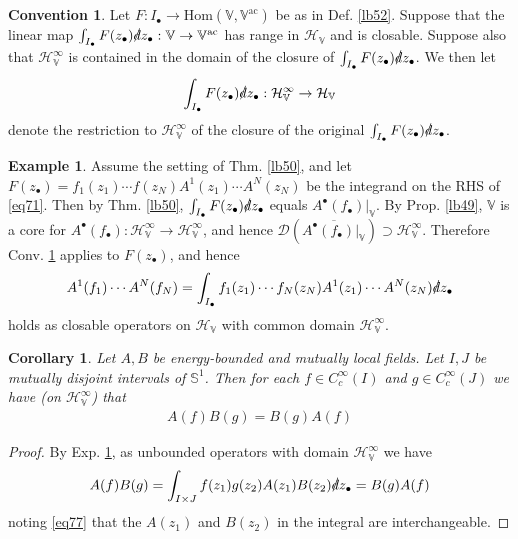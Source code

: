 \documentclass[12pt,b5paper,notitlepage]{article}
\theoremstyle{definition}
\newtheorem{eg}[df]{Example}
\newtheorem{cv}[df]{Convention}
\theoremstyle{plain}
\newtheorem{co}[df]{Corollary}
\newcommand{\ovl}{\overline}
\newcommand{\Hom}{\mathrm{Hom}}
\newcommand{\Dom}{\scr{D}}
\newcommand{\scr}{\mathscr}
\newcommand{\blt}{\bullet}
\newcommand{\Vbb}{\mathbb V}
\newcommand{\Sbb}{{\mathbb S}}
\newcommand{\HV}{\mathcal H_{\mathbb V}}
\newcommand{\sd}{\slashed{d}}
\newcommand{\ac}{\mathrm{ac}}
\numberwithin{equation}{section}
\begin{document}
\subsection{}


\begin{cv}\label{lb53}
Let $F:I_\blt\rightarrow\Hom(\Vbb,\Vbb^\ac)$ be as in Def. \ref{lb52}. Suppose that the linear map $\int_{I_\blt}F(z_\blt)\sd z_\blt:\Vbb\rightarrow\Vbb^\ac$ has range in $\HV$ and is closable. Suppose also that $\HV^\infty$ is contained in the domain of the closure of $\int_{I_\blt}F(z_\blt)\sd z_\blt$. We then let \index{zz@$\int_{I_\blt}F(z_\blt)\sd z_\blt$} 
\begin{align*}
\int_{I_\blt}F(z_\blt)\sd z_\blt:\HV^\infty\rightarrow\HV
\end{align*}
denote the restriction to $\HV^\infty$ of the closure of the original $\int_{I_\blt}F(z_\blt)\sd z_\blt$. 
\end{cv}


\begin{eg}\label{lb54}
Assume the setting of Thm. \ref{lb50}, and let $F(z_\blt)=f_1(z_1)\cdots f(z_N)A^1(z_1)\cdots A^N(z_N)$ be the integrand on the RHS of \eqref{eq71}. Then by Thm. \ref{lb50}, $\int_{I_\blt}F(z_\blt)\sd z_\blt$ equals $A^\blt(f_\blt)|_\Vbb$. By Prop. \ref{lb49}, $\Vbb$ is a core for $A^\blt(f_\blt):\HV^\infty\rightarrow\HV^\infty$, and hence $\Dom(\ovl{A^\blt(f_\blt)|_\Vbb})\supset\HV^\infty$. Therefore Conv. \ref{lb53} applies to $F(z_\blt)$, and hence
\begin{align}
A^1(f_1)\cdots A^N(f_N)=\int_{I_\blt} f_1(z_1)\cdots f_N(z_N)A^1(z_1)\cdots A^N(z_N)\sd z_\blt
\end{align}
holds as closable operators on $\HV$ with common domain $\HV^\infty$.
\end{eg}


\begin{co}\label{lb66}
Let $A,B$ be energy-bounded and mutually local fields. Let $I,J$ be mutually disjoint intervals of $\Sbb^1$. Then for each $f\in C_c^\infty(I)$ and $g\in C_c^\infty(J)$ we have (on $\HV^\infty$) that
\begin{align*}
A(f)B(g)=B(g)A(f)
\end{align*}
\end{co}


\begin{proof}
By Exp. \ref{lb54}, as unbounded operators with domain $\HV^\infty$ we have
\begin{align*}
A(f)B(g)=\int_{I\times J}f(z_1)g(z_2)A(z_1)B(z_2)\sd z_\blt=B(g)A(f)
\end{align*}
noting \eqref{eq77} that the $A(z_1)$ and $B(z_2)$ in the integral are interchangeable.
\end{proof}
\end{document}
